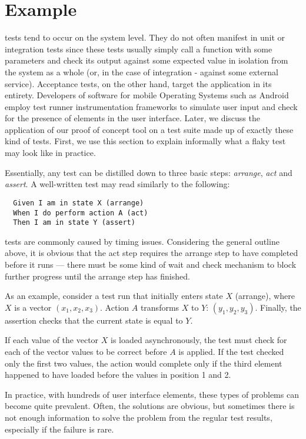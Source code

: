 \section{Example}
\label{sec:example}

\Flaky tests tend to occur on the system level. They do not often manifest in
unit or integration tests since these tests usually simply call a function with
some parameters and check its output against some expected value in isolation
from the system as a whole (or, in the case of integration - against some
external service). Acceptance tests, on the other hand, target the application
in its entirety. Developers of software for mobile Operating Systems such as
Android employ test runner instrumentation frameworks to simulate user input and
check for the presence of elements in the user interface. Later, we discuss the
application of our proof of concept tool on a test suite made up of exactly
these kind of tests. First, we use this section to explain informally what a
flaky test may look like in practice.

Essentially, any test can be distilled down to three basic steps:
\textit{arrange}, \textit{act} and \textit{assert}. A well-written test may read
similarly to the following:
\begin{verbatim}
  Given I am in state X (arrange)
  When I do perform action A (act)
  Then I am in state Y (assert)
\end{verbatim}

\Flaky tests are commonly caused by timing issues. Considering the general
outline above, it is obvious that the act step requires the arrange step to have
completed before it runs --- there must be some kind of wait and check mechanism
to block further progress until the arrange step has finished.

As an example, consider a test run that initially enters state $X$
(arrange), where $X$ is a vector $(x_{1}, x_{2}, x_{3})$. Action $A$
transforms $X$ to $Y$: $(y_{1}, y_{2}, y_{3})$. Finally, the assertion
checks that the current state is equal to $Y$.

If each value of the vector $X$ is loaded asynchronously, the test must
check for each of the vector values to be correct before $A$ is applied. If the
test checked only the first two values, the action would complete only if the
third element happened to have loaded before the values in position 1 and 2.

In practice, with hundreds of user interface elements, these types of problems
can become quite prevalent. Often, the solutions are obvious, but sometimes
there is not enough information to solve the problem from the regular test
results, especially if the failure is rare.
